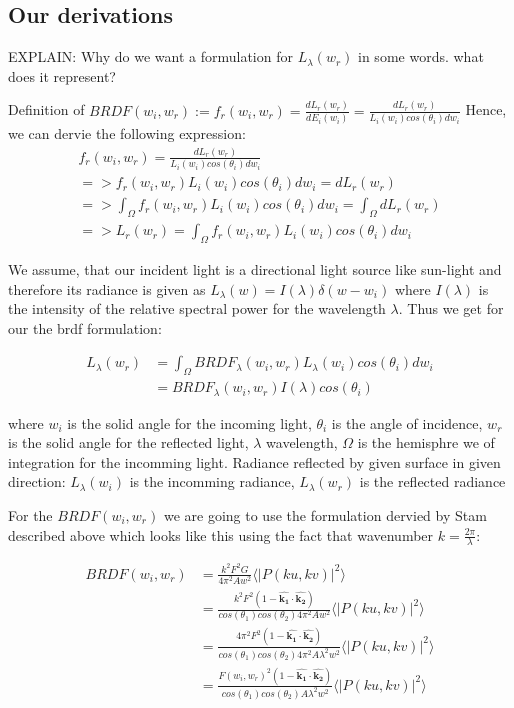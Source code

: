 \subsection{Our derivations}

EXPLAIN: Why do we want a formulation for $L_{\lambda}(w_r)$ in some words. what does it represent?

Definition of $BRDF(w_i, w_r) := f_r(w_i, w_r) = \frac{dL_r(w_r)}{dE_i(w_i)}=\frac{dL_r(w_r)}{L_i(w_i)cos(\theta_i)dw_i}$  
Hence, we can dervie the following expression:
\begin{align*}
f_r(w_i, w_r) = \frac{dL_r(w_r)}{L_i(w_i)cos(\theta_i)dw_i} \\
=> f_r(w_i, w_r) L_i(w_i)cos(\theta_i)dw_i = dL_r(w_r) \\
=> \int_{\Omega}f_r(w_i, w_r) L_i(w_i)cos(\theta_i)dw_i = \int_{\Omega}dL_r(w_r) \\
=> L_r(w_r) = \int_{\Omega}f_r(w_i, w_r) L_i(w_i)cos(\theta_i)dw_i
\end{align*}

We assume, that our incident light is a directional light source like sun-light and therefore its radiance is given as $L_{\lambda}(w)=I(\lambda)\delta(w-w_i)$ where $I(\lambda)$ is the intensity of the relative spectral power for the wavelength $\lambda$. Thus we get for our the brdf formulation:

\begin{align}
L_{\lambda}(w_r) 
& = \int_{\Omega} BRDF_{\lambda}(w_i, w_r) L_{\lambda}(w_i) cos(\theta_i) dw_i \\
& = BRDF_{\lambda}(w_i, w_r) I(\lambda) cos(\theta_i)
\end{align}

where $w_i$ is the solid angle for the incoming light, $\theta{_i}$ is the angle of incidence,
$w_r$ is the solid angle for the reflected light, $\lambda$ wavelength, $\Omega$ is the hemisphre we of integration for the incomming light.
Radiance reflected by given surface in given direction:
$L_{\lambda}(w_i)$ is the incomming radiance, $L_{\lambda}(w_r)$ is the reflected radiance

For the $BRDF(w_i, w_r)$ we are going to use the formulation dervied by Stam described above which looks like this using the fact that wavenumber $k=\frac{2\pi}{\lambda}$:

\begin{align*}
BRDF(w_i, w_r) 
& = \frac{k^2 F^2 G}{4\pi^2 A w^2} \langle \left|P(ku, kv) \right|^2\rangle \\
& = \frac{k^2 F^2 (1-\hat{\mathbf{k_1}}\cdot\hat{\mathbf{k_2}})}{cos(\theta_1)cos(\theta_2) 4\pi^2 A w^2} \langle \left|P(ku, kv)  \right|^2\rangle \\
& = \frac{4 \pi^2 F^2 (1-\hat{\mathbf{k_1}}\cdot\hat{\mathbf{k_2}})}{cos(\theta_1)cos(\theta_2) 4\pi^2 A \lambda^2 w^2} \langle \left|P(ku, kv)  \right|^2\rangle \\
& = \frac{F(w_i, w_r)^2 (1-\hat{\mathbf{k_1}}\cdot\hat{\mathbf{k_2}})}{cos(\theta_1)cos(\theta_2) A \lambda^2 w^2} \langle \left|P(ku, kv)  \right|^2\rangle
\end{align*}

